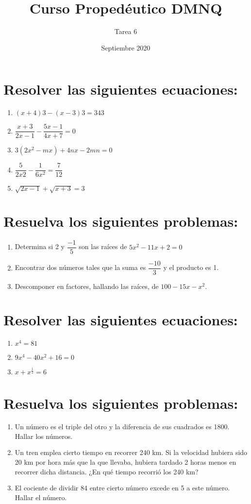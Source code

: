 \documentclass{article}
\title{Curso Propedéutico DMNQ}
\author{Tarea 6}
\date{Septiembre 2020}
\begin{document}
\maketitle

\section*{Resolver las siguientes ecuaciones:}

\begin{enumerate}
    \item $(x + 4)3 - (x - 3)3 = 343$
    \item $\dfrac{x+3}{2x-1} - \dfrac{5x-1}{4x+7} = 0$
    \item $3(2x^2 - mx)+4nx - 2mn=0$
    \item $\dfrac{5}{2x2} - \dfrac{1}{6x^2} = \dfrac{7}{12}$
    \item $\sqrt{2x-1}+\sqrt{x+3}=3$
\end{enumerate}

\section*{Resuelva los siguientes problemas:}

\begin{enumerate}
    \item  Determina si 2 y $\dfrac{-1}{5}$ son las raíces de $5x^2 - 11x + 2 = 0$
    \item Encontrar dos números tales que la suma es $\dfrac{-10}{3}$ y el producto es 1.
    \item Descomponer en factores, hallando las raíces, de $100 - 15x - x^2$.
\end{enumerate}

\section*{Resolver las siguientes ecuaciones:}

\begin{enumerate}
    \item $x^4 = 81$
    \item $9x^4 - 40x^2 + 16 = 0$
    \item $x + x^{\frac{1}{2}} = 6$
\end{enumerate}

\section*{Resuelva los siguientes problemas:}

\begin{enumerate}
    \item Un número es el triple del otro y la diferencia de sus cuadrados es 1800. Hallar los números.
    \item Un tren emplea cierto tiempo en recorrer 240 km. Si la velocidad hubiera sido 20 km por hora más que la que llevaba, hubiera tardado 2 horas menos en recorrer dicha
distancia. ¿En qué tiempo recorrió los 240 km?
    \item El cociente de dividir 84 entre cierto número excede en 5 a este número. Hallar el número.
\end{enumerate}
\end{document}

